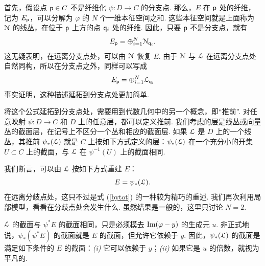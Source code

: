 首先，假设点 ${\sf p}\in C$ 不是纤维化 $\psi:D\to C$ 的分支点. 那么，$E$ 在 ${\sf p}$ 处的纤维，记为 $E_{\sf p}$，可以分解为 $\varphi$ 的 $N$ 个一维本征空间之和. 这些本征空间就是上面称为 ${\cal N}$ 的线丛，在位于 ${\sf p}$ 上方的点 ${\sf q}_i$ 处的纤维. 因此，只要 ${\sf p}$ 不是分支点，就有
\begin{equation}
\label{ytot}
E_{\sf p}=\oplus_{i=1}^N{\cal N}_{{\sf q}_i}.
\end{equation}
这无疑表明，在远离分支点处，可以由 ${\cal N}$ 恢复 $E$. 由于 ${\cal N}$ 与 ${\cal L}$ 在远离分支点处自然同构，所以在分支点之外，同样可以写成
\begin{equation}
\label{bytot}
E_{\sf p}=\oplus_{i=1}^N{\cal L}_{{\sf q}_i}
\end{equation}
事实证明，这种描述延拓到分支点处更加简单.

将这个公式延拓到分支点处，需要用到代数几何中的另一个概念，即“推前”. 对任意映射 $\psi:D\to C$ 和 $D$ 上的任意层，都可以定义推前. 我们考虑的层是线丛或向量丛的截面层，在记号上不区分一个丛和相应的截面层. 如果 ${\cal L}$ 是 $D$ 上的一个线丛，其推前 $\psi_*({\cal L})$ 就是 $C$ 上按如下方式定义的层：$\psi_*({\cal L})$ 在一个充分小的开集 $U\subset C$ 上的截面，与 ${\cal L}$ 在 $\psi^{-1}(U)$ 上的截面相同.

我们断言，可以由 ${\cal L}$ 按如下方式重建 $E$：
\begin{equation}
\label{hytot}E=\psi_*({\cal L}).
\end{equation}
在远离分歧点处，这只不过是式 (\ref{bytot}) 的一种较为精巧的重述. 我们再次利用局部模型，看看在分歧点处会发生什么. 虽然结果是一般的，这里只讨论 $N=2$.

${\cal L}$ 的截面与 $\psi^*E$ 的截面相同，只是必须模去 ${\rm Im}(\varphi-y)$ 的生成元 $u$. 非正式地说，$\psi_*(\psi^*E)$ 的截面就是 $E$ 的截面，但允许它依赖于 $y$. 因此，$\psi_*({\cal L})$ 的截面是满足如下条件的 $E$ 的截面：{\it (i)} 它可以依赖于 $y$；{\it (ii)} 如果它是 $u$ 的倍数，就视为平凡的.

